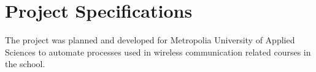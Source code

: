 
\chapter{Project Specifications}
The project was planned and developed for Metropolia University of Applied Sciences to automate processes used in wireless communication related courses in the school. 

\clearpage %
